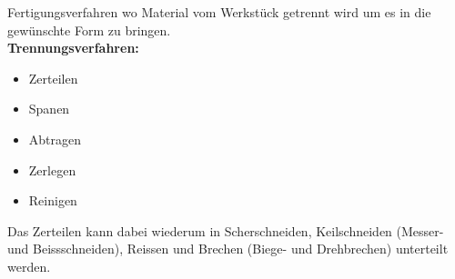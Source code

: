 Fertigungsverfahren wo Material vom Werkstück getrennt wird
um es in die gewünschte Form zu bringen.\\

\textbf{Trennungsverfahren:}\\

\begin{minipage}{0.5\linewidth}
    \begin{itemize}
        \item Zerteilen
        \item Spanen
        \item Abtragen
    \end{itemize}
\end{minipage}
\begin{minipage}{0.5\linewidth}
    \begin{itemize}
        \item Zerlegen
        \item Reinigen
    \end{itemize}
\end{minipage}
\vspace{1mm}

Das Zerteilen kann dabei wiederum in Scherschneiden, Keilschneiden (Messer- und Beissschneiden), Reissen und Brechen (Biege- und Drehbrechen) unterteilt werden.\\
